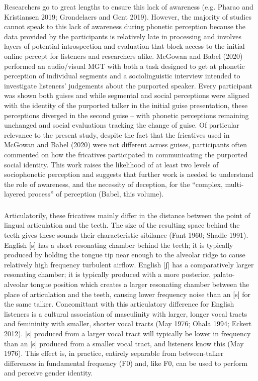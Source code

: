 \documentclass[
  letterpaper,
  DIV=11,
  numbers=noendperiod]{scrartcl}
\begin{document}
Researchers go to great lengths to ensure this lack of awareness (e.g.
Pharao and Kristiansen 2019; Grondelaers and Gent 2019). However, the
majority of studies cannot speak to this lack of awareness during
phonetic perception because the data provided by the participants is
relatively late in processing and involves layers of potential
introspection and evaluation that block access to the initial online
percept for listeners and researchers alike. McGowan and Babel (2020)
performed an audio/visual MGT with both a task designed to get at
phonetic perception of individual segments and a sociolinguistic
interview intended to investigate listeners' judgements about the
purported speaker. Every participant was shown both guises and while
segmental and social perceptions were aligned with the identity of the
purported talker in the initial guise presentation, these perceptions
diverged in the second guise -- with phonetic perceptions remaining
unchanged and social evaluations tracking the change of guise. Of
particular relevance to the present study, despite the fact that the
fricatives used in McGowan and Babel (2020) were not different across
guises, participants often commented on how the fricatives participated
in communicating the purported social identity. This work raises the
likelihood of at least two levels of sociophonetic perception and
suggests that further work is needed to understand the role of
awareness, and the necessity of deception, for the ``complex,
multi-layered process'' of perception (Babel, this volume).

\subsubsection{}\label{section}

Articulatorily, these fricatives mainly differ in the distance between
the point of lingual articulation and the teeth. The size of the
resulting space behind the teeth gives these sounds their characteristic
sibilance (Fant 1960; Shadle 1991). English {[}s{]} has a short
resonating chamber behind the teeth; it is typically produced by holding
the tongue tip near enough to the alveolar ridge to cause relatively
high frequency turbulent airflow. English {[}ʃ{]} has a comparatively
larger resonating chamber; it is typically produced with a more
posterior, palato-alveolar tongue position which creates a larger
resonating chamber between the place of articulation and the teeth,
causing lower frequency noise than an {[}s{]} for the same talker.
Concomittant with this articulatory difference for English listeners is
a cultural association of masculinity with larger, longer vocal tracts
and femininity with smaller, shorter vocal tracts (May 1976; Ohala 1994;
Eckert 2012). {[}s{]} produced from a larger vocal tract will typically
be lower in frequency than an {[}s{]} produced from a smaller vocal
tract, and listeners know this (May 1976). This effect is, in practice,
entirely separable from between-talker differences in fundamental
frequency (F0) and, like F0, can be used to perform and perceive gender
identity.
\end{document}

